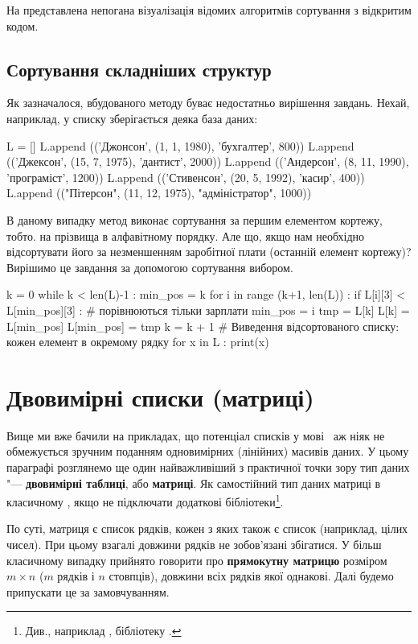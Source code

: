 На  представлена непогана візуалізація відомих алгоритмів сортування з відкритим кодом.

\subsection{Сортування складніших структур}

Як зазначалося, вбудованого методу  буває недостатньо вирішення завдань. Нехай, наприклад, у списку  зберігається деяка база даних:
\begin{py}{}
L = []
L.append (('Джонсон', (1, 1, 1980), 'бухгалтер', 800))
L.append (('Джексон', (15, 7, 1975), 'дантист', 2000))
L.append (('Андерсон', (8, 11, 1990), 'програміст', 1200))
L.append (('Стивенсон', (20, 5, 1992), 'касир', 400))
L.append (("Пітерсон", (11, 12, 1975), "адміністратор", 1000))
\end{py}
\noindent В даному випадку метод  виконає сортування за першим елементом кортежу, тобто. на прізвища в алфавітному порядку. Але що, якщо нам необхідно відсортувати його за незменшенням заробітної плати (останній елемент кортежу)? Вирішимо це завдання за допомогою сортування вибором.

\begin{py}{}
k = 0
while k < len(L)-1 :
    min_pos = k
    for i in range (k+1, len(L)) :
        if L[i][3] < L[min_pos][3] : # порівнюються тільки зарплати
            min_pos = i
    tmp = L[k]
    L[k] = L[min_pos]
    L[min_pos] = tmp
    k = k + 1
# Виведення відсортованого списку: кожен елемент в окремому рядку
for x in L :
    print(x)
\end{py}

\section{Двовимірні списки (матриці)}

Вище ми вже бачили на прикладах, що потенціал списків у мові \Python\ аж ніяк не обмежується зручним поданням одновимірних (лінійних) масивів даних. У цьому параграфі розглянемо ще один найважливіший з практичної точки зору тип даних "--- \textbf{двовимірні таблиці}, або \textbf{матриці}. Як самостійний тип даних матриці в класичному \Python {}, якщо не підключати додаткові бібліотеки\footnote{Див., наприклад , бібліотеку .}.

По суті, матриця є список рядків, кожен з яких також є список (наприклад, цілих чисел). При цьому взагалі довжини рядків не зобов'язані збігатися. У більш класичному випадку прийнято говорити про \textbf{прямокутну матрицю} розміром $ m \times n $ ($ m $ рядків і $ n $ стовпців), довжини всіх рядків якої однакові. Далі будемо припускати це за замовчуванням.


